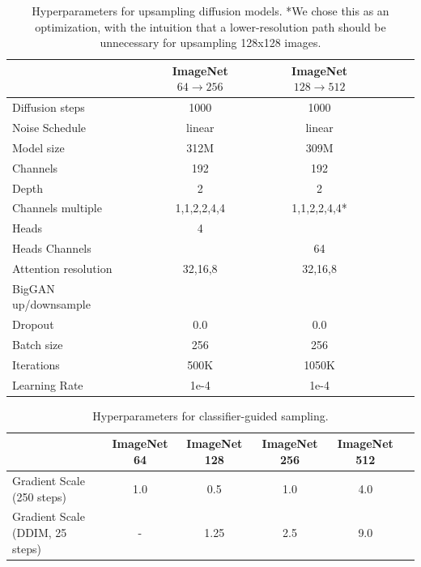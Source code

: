 \documentclass{article}
\newcommand{\cmark}{\ding{51}}%
\begin{document}
\begin{table}[h]
    \setlength\tabcolsep{4pt}
    \begin{center}
    \begin{small}
    \begin{tabular}{lccccc}
    \toprule
     & ImageNet $64 \rightarrow 256$ & ImageNet $128 \rightarrow 512$\\
    \midrule
    Diffusion steps & 1000 & 1000 \\
    Noise Schedule & linear & linear \\
    Model size & 312M & 309M & \\
    Channels & 192 & 192 \\
    Depth & 2 & 2 \\
    Channels multiple & 1,1,2,2,4,4 & 1,1,2,2,4,4* \\
    Heads & 4 & \\
    Heads Channels & & 64 \\
    Attention resolution & 32,16,8 & 32,16,8 \\
    BigGAN up/downsample & \cmark & \cmark \\
    Dropout & 0.0 & 0.0 \\
    Batch size & 256 & 256 \\
    Iterations & 500K & 1050K \\
    Learning Rate & 1e-4 & 1e-4 \\
    \bottomrule
    \end{tabular}
    \end{small}
    \end{center}
    \caption{Hyperparameters for upsampling diffusion models. *We chose this as an optimization, with the intuition that a lower-resolution path should be unnecessary for upsampling 128x128 images.}
    \label{tab:hpsupsample}
    \vskip -0.2in
\end{table}

\begin{table}[h]
    \begin{center}
    \begin{small}
    \begin{tabular}{lccccc}
    \toprule
    & ImageNet 64 & ImageNet 128 & ImageNet 256 & ImageNet 512 \\
    \midrule
    Gradient Scale (250 steps) & 1.0 & 0.5 & 1.0 & 4.0 \\
    Gradient Scale (DDIM, 25 steps) & - & 1.25 & 2.5 & 9.0 \\
    \bottomrule
    \end{tabular}
    \end{small}
    \end{center}
    \caption{Hyperparameters for classifier-guided sampling.}
    \label{tab:hpguided}
    \vskip -0.2in
\end{table}
\end{document}

